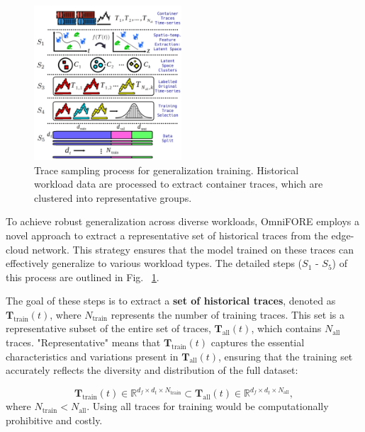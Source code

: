 \documentclass{ieeetmlcn}
\begin{document}
\begin{figure}\centering
\centering
\includegraphics[width=0.49\textwidth]{img/proposed_solution_trace_selection.pdf}
\caption{Trace sampling process for generalization training. Historical workload data are processed to extract container traces, which are clustered into representative groups.}
\label{fig:proposed_solution_trace_selection}
\end{figure}

To achieve robust generalization across diverse workloads, OmniFORE employs a novel approach to extract a representative set of historical traces from the edge-cloud network. This strategy ensures that the model trained on these traces can effectively generalize to various workload types. The detailed steps ($S_1$ - $S_5$) of this process are outlined in Fig. ~\ref{fig:proposed_solution_trace_selection}.

The goal of these steps is to extract a \textbf{set of historical traces}, denoted as \(\mathbf{T}_{\text{train}}(t)\), where \(N_{\text{train}}\) represents the number of training traces. This set is a representative subset of the entire set of traces, \(\mathbf{T}_{\text{all}}(t)\), which contains \(N_{\text{all}}\) traces. "Representative" means that \(\mathbf{T}_{\text{train}}(t)\) captures the essential characteristics and variations present in \(\mathbf{T}_{\text{all}}(t)\), ensuring that the training set accurately reflects the diversity and distribution of the full dataset:

\begin{equation}
\mathbf{T}_{\text{train}}(t) \in \mathbb{R}^{d_f \times d_t \times N_{\text{train}}} \subset \mathbf{T}_{\text{all}}(t) \in \mathbb{R}^{d_f \times d_t \times N_{\text{all}}},
\end{equation}
where $N_{\text{train}} < N_{\text{all}}$. Using all traces for training would be computationally prohibitive and costly.
\end{document}
